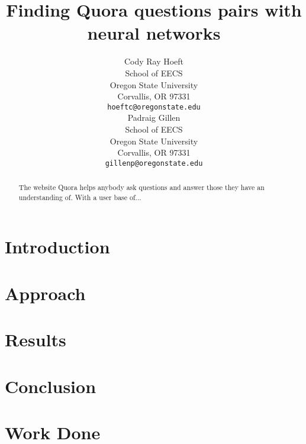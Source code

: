 \documentclass{article}
\title{Finding Quora questions pairs with neural networks}
\author{
    Cody Ray Hoeft \\
    School of EECS \\
    Oregon State University \\
    Corvallis, OR 97331 \\
    \texttt{hoeftc@oregonstate.edu} \\
    \And
    Padraig Gillen \\
    School of EECS \\
    Oregon State University \\
    Corvallis, OR 97331 \\
    \texttt{gillenp@oregonstate.edu} \\
}
\begin{document}

\maketitle

\begin{abstract}
    The website Quora helps anybody ask questions and answer those they have an understanding of.
    With a user base of...
\end{abstract}

\section{Introduction}

\section{Approach}


\section{Results}

\section{Conclusion}

\appendix
\section{Work Done}
\end{document}
